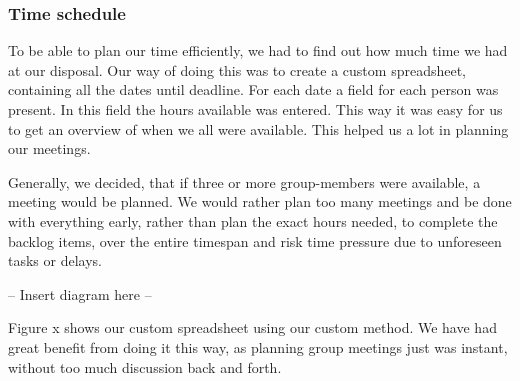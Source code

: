 \subsubsection{Time schedule}
To be able to plan our time efficiently, we had to find out how much time we had at our disposal. Our way of doing this was to create a custom spreadsheet, containing all the dates until deadline. For each date a field for each person was present. In this field the hours available was entered. This way it was easy for us to get an overview of when we all were available. This helped us a lot in planning our meetings.

Generally, we decided, that if three or more group-members were available, a meeting would be planned. We would rather plan too many meetings and be done with everything early, rather than plan the exact hours needed, to complete the backlog items, over the entire timespan and risk time pressure due to unforeseen tasks or delays.

-- Insert diagram here --

Figure x shows our custom spreadsheet using our custom method. We have had great benefit from doing it this way, as planning group meetings just was instant, without too much discussion back and forth.